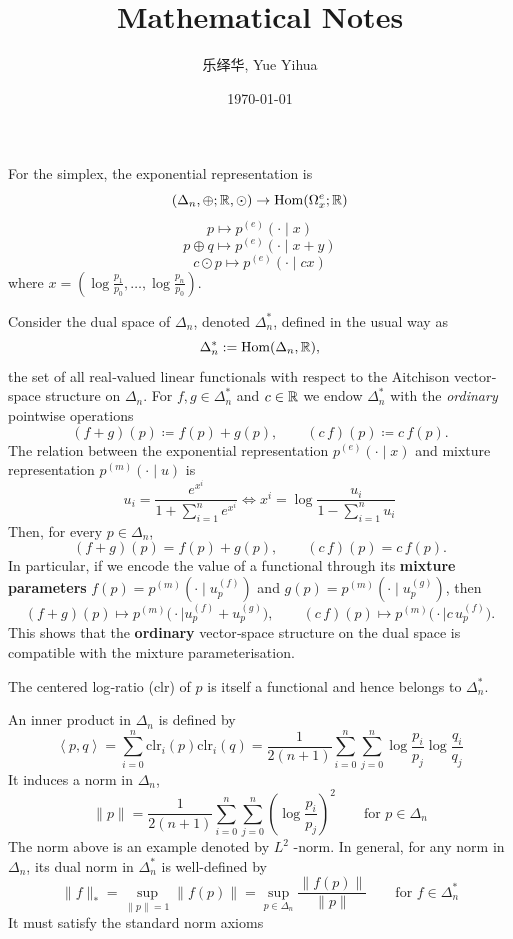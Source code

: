 \documentclass{amsart}
\author{乐绎华, Yue Yihua}
\date{\today}
\title{Mathematical Notes}
\let\originalmathbb\mathbb
\renewcommand{\mathbb}[1]{%
    \ifstrequal{#1}{1}{\mathbbm{#1}}{\originalmathbb{#1}}%
}
\theoremstyle{plain}
\theoremstyle{definition}
\theoremstyle{remark}
\begin{document}
\maketitle
\tableofcontents

For the simplex, the exponential representation is
\[
(\Delta _n,\oplus ;\mathbb{R},\odot )\to \mathrm{Hom}(\Omega^{e}_{x};\mathbb{R})
\]
\[
p\mapsto p^{(e)}(\cdot \mid x)
\]
\[
p\oplus q\mapsto p^{(e)}(\cdot \mid x+y)
\]
\[
c\odot p\mapsto p^{(e)}(\cdot \mid cx)
\]
where $x=\left( \log\frac{p_1}{p_0},\dots,\log\frac{p_n}{p_0} \right)$.

Consider the dual space of $\Delta _n$, denoted $\Delta _n^{*}$, defined in the usual way as
\[
\Delta _n^{*}:=\mathrm{Hom}(\Delta _n,\mathbb{R}),
\]
the set of all real‐valued linear functionals with respect to the Aitchison vector‐space structure on $\Delta_n$.  For $f,g\in\Delta _n^{*}$ and $c\in\mathbb{R}$ we endow $\Delta _n^{*}$ with the \textit{ordinary} pointwise operations
\[
(f+g)(p)\coloneqq f(p)+g(p),\qquad (c\,f)(p)\coloneqq c\,f(p).
\]
The relation between the exponential representation $p^{(e)}(\cdot \mid x)$ and mixture representation $p^{(m)}(\cdot \mid u)$ is
\[
u_i=\frac{e^{ x^{i} }}{1+\sum_{i=1}^{n} e^{ x^{i} }}\iff x^{i}=\log\frac{u_i}{1-\sum_{i=1}^{n} u_i}
\]
Then, for every $p\in\Delta_n$,
\[
(f+g)(p)=f(p)+g(p),\qquad (c\,f)(p)=c\,f(p).
\]
In particular, if we encode the value of a functional through its \textbf{mixture parameters}
$f(p)=p^{(m)}(\cdot\mid u^{(f)}_p)$ and $g(p)=p^{(m)}(\cdot\mid u^{(g)}_p)$, then
\[
(f+g)(p)\mapsto p^{(m)}\bigl(\cdot\mid u^{(f)}_p+u^{(g)}_p\bigr),\qquad
(c\,f)(p)\mapsto p^{(m)}\bigl(\cdot\mid c\,u^{(f)}_p\bigr).
\]
This shows that the \textbf{ordinary} vector‐space structure on the dual space is compatible with the mixture parameterisation.

The centered log‐ratio (clr) of $p$ is itself a functional and hence belongs to $\Delta _n^{*}$.

An inner product in $\Delta _n$ is defined by
\[
\left< p,q \right>  =\sum_{i=0}^{n} \text{clr}_i(p)\text{clr}_i(q)=\frac{1}{2(n+1)}\sum_{i=0}^{n} \sum_{j=0}^{n} \log\frac{p_i}{p_j}\log\frac{q_i}{q_j}
\]
It induces a norm in $\Delta _n$,
\[
\lVert p \rVert =\frac{1}{2(n+1)}\sum_{i=0}^{n} \sum_{j=0}^{n} \left( \log\frac{p_i}{p_j} \right)^{2}\qquad \text{for }p\in \Delta _n
\]
The norm above is an example denoted by $L^{2}$ -norm. In general, for any norm in $\Delta _n$, its dual norm in $\Delta _n^{*}$ is well-defined by
\[
\lVert f \rVert _{*}=\sup_{\lVert p \rVert =1}\lVert f(p) \rVert =\sup_{p\in\Delta _n}\frac{\lVert f(p) \rVert }{\lVert p \rVert }\qquad \text{for }f\in \Delta _n^{*}
\]
It must satisfy the standard norm axioms
\end{document}
